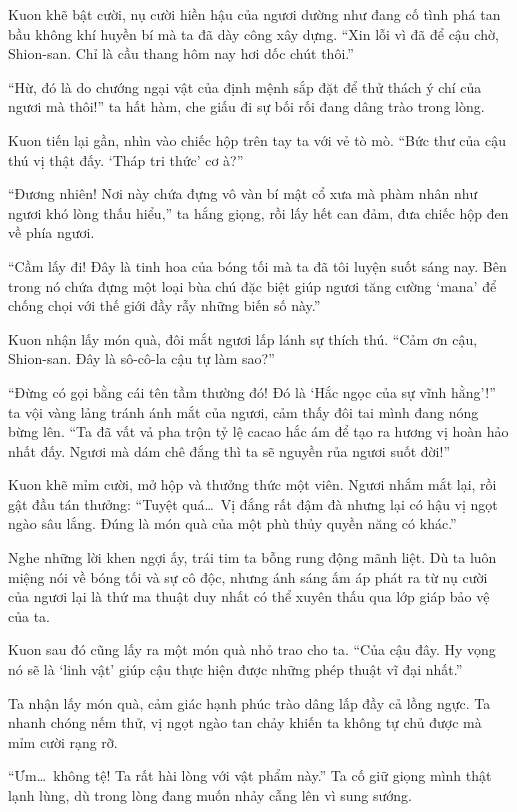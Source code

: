 \documentclass[../main.tex]{subfiles}
\begin{document}
Kuon khẽ bật cười, nụ cười hiền hậu của ngươi dường như đang cố tình phá tan bầu không khí huyền bí mà ta đã dày công xây dựng. ``Xin lỗi vì đã để cậu chờ, Shion-san. Chỉ là cầu thang hôm nay hơi dốc chút thôi.''

``Hừ, đó là do chướng ngại vật của định mệnh sắp đặt để thử thách ý chí của ngươi mà thôi!'' ta hất hàm, che giấu đi sự bối rối đang dâng trào trong lòng.

Kuon tiến lại gần, nhìn vào chiếc hộp trên tay ta với vẻ tò mò. ``Bức thư của cậu thú vị thật đấy. `Tháp tri thức' cơ à?''

``Đương nhiên! Nơi này chứa đựng vô vàn bí mật cổ xưa mà phàm nhân như ngươi khó lòng thấu hiểu,'' ta hắng giọng, rồi lấy hết can đảm, đưa chiếc hộp đen về phía ngươi.

``Cầm lấy đi! Đây là tinh hoa của bóng tối mà ta đã tôi luyện suốt sáng nay. Bên trong nó chứa đựng một loại bùa chú đặc biệt giúp ngươi tăng cường `mana' để chống chọi với thế giới đầy rẫy những biến số này.''

Kuon nhận lấy món quà, đôi mắt ngươi lấp lánh sự thích thú. ``Cảm ơn cậu, Shion-san. Đây là sô-cô-la cậu tự làm sao?''

``Đừng có gọi bằng cái tên tầm thường đó! Đó là `Hắc ngọc của sự vĩnh hằng'!'' ta vội vàng lảng tránh ánh mắt của ngươi, cảm thấy đôi tai mình đang nóng bừng lên. ``Ta đã vất vả pha trộn tỷ lệ cacao hắc ám để tạo ra hương vị hoàn hảo nhất đấy. Ngươi mà dám chê đắng thì ta sẽ nguyền rủa ngươi suốt đời!''

Kuon khẽ mỉm cười, mở hộp và thưởng thức một viên. Ngươi nhắm mắt lại, rồi gật đầu tán thưởng: ``Tuyệt quá\dots\ Vị đắng rất đậm đà nhưng lại có hậu vị ngọt ngào sâu lắng. Đúng là món quà của một phù thủy quyền năng có khác.''

Nghe những lời khen ngợi ấy, trái tim ta bỗng rung động mãnh liệt. Dù ta luôn miệng nói về bóng tối và sự cô độc, nhưng ánh sáng ấm áp phát ra từ nụ cười của ngươi lại là thứ ma thuật duy nhất có thể xuyên thấu qua lớp giáp bảo vệ của ta.

Kuon sau đó cũng lấy ra một món quà nhỏ trao cho ta. ``Của cậu đây. Hy vọng nó sẽ là `linh vật' giúp cậu thực hiện được những phép thuật vĩ đại nhất.''

Ta nhận lấy món quà, cảm giác hạnh phúc trào dâng lấp đầy cả lồng ngực. Ta nhanh chóng nếm thử, vị ngọt ngào tan chảy khiến ta không tự chủ được mà mỉm cười rạng rỡ.

``Ưm\dots\ không tệ! Ta rất hài lòng với vật phẩm này.'' Ta cố giữ giọng mình thật lạnh lùng, dù trong lòng đang muốn nhảy cẫng lên vì sung sướng.
\end{document}
